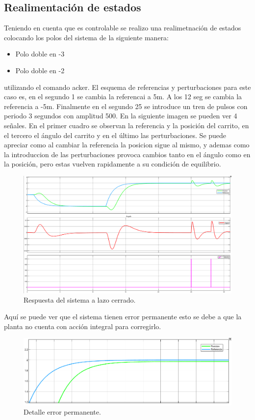  \subsection{Realimentaci\'on de estados}
 Teniendo en cuenta que es controlable se realizo una realimetnaci\'on de estados colocando los polos del sistema de la siguiente manera:
 \begin{itemize}
 \item Polo doble en -3
  \item Polo doble en -2
\end{itemize}
utilizando el comando acker.
El esquema de referencias y perturbaciones para este caso es, en el segundo 1 se cambia la referencai a 5m. A los 12 seg se cambia la referencia a -5m. Finalmente en el segundo 25 se introduce un tren de pulsos con periodo 3 segundos con amplitud 500.
En la siguiente imagen se pueden ver 4 señales. En el primer cuadro se observan la referencia y la posición del carrito, en el tercero el ángulo del carrito y en el último las perturbaciones.
Se puede apreciar como al cambiar la referencia la posicion sigue al mismo, y ademas como la introduccion de las perturbaciones provoca cambios tanto en el ángulo como en la posición, pero estas vuelven rapidamente a su condición de equilibrio. 
\begin{figure}[H]
	\centering
	\includegraphics[width=1\linewidth]{Imagenes/Control_por_realimentacion/general.png}
	\caption{Respuesta del sistema a lazo cerrado.}
	\label{realmentacion}
\end{figure}

Aquí se puede ver que el sistema tienen error permanente esto se debe a que la planta no cuenta con acción integral para corregirlo.
\begin{figure}[H]
	\centering
	\includegraphics[width=1\linewidth]{Imagenes/Control_por_realimentacion/detalle_error_permanente.png}
	\caption{Detalle error permanente.}
	\label{realmentacion_error}
\end{figure}

